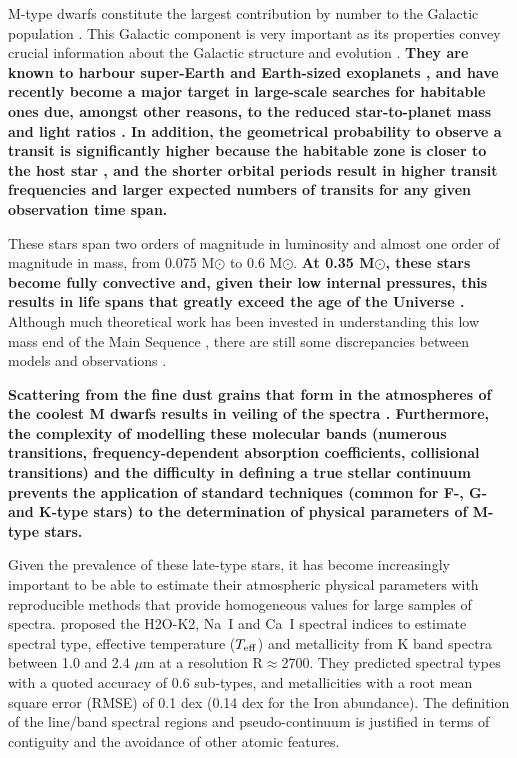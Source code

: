
M-type dwarfs constitute the largest contribution by number to the
Galactic population \citep{2010AJ....139.2679B}. This Galactic
component is very important as its properties convey crucial
information about the Galactic structure and
evolution \citep{2013A&A...556A.110B}. {\bf They are known to harbour
super-Earth \citep{2013A&A...556A.110B} and Earth-sized
exoplanets \citep{2015ApJ...807...45D}, and have recently become a
major target in large-scale searches for habitable ones due, amongst
other reasons, to the reduced star-to-planet mass and light
ratios \citep{2015A&A...577A.128A}. In addition, the geometrical
probability to observe a transit is significantly higher because the
habitable zone is closer to the host star \citep{Shields20161}, and
the shorter orbital periods result in higher transit frequencies and
larger expected numbers of transits for any given observation time
span.}

These stars span two orders of magnitude in luminosity and almost one
order of magnitude in mass, from 0.075 M$\odot$ to 0.6 M$\odot$. {\bf
At 0.35 M$\odot$, these stars become fully convective and, given their
low internal pressures, this results in life spans that greatly exceed
the age of the Universe \citep{2005AN....326..913A}.} Although much
theoretical work has been invested in understanding this low mass end
of the Main Sequence \citep{2008ApJ...676.1262B}, there are still some
discrepancies between models and observations \citep[see e.g.][for an
account of the observed inflated radii and cooler temperatures with
respect to model predictions]{2013AN....334....4T}.

{\bf Scattering from the fine dust grains that form in the atmospheres
of the coolest M dwarfs results in veiling of the
spectra \citep{2012EAS....57....3A}. Furthermore, the complexity of
modelling these molecular bands (numerous transitions,
frequency-dependent absorption coefficients, collisional transitions)
and the difficulty in defining a true stellar continuum prevents the
application of standard techniques (common for F-, G- and K-type
stars) to the determination of physical parameters of M-type stars.}

Given the prevalence of these late-type stars, it has become
increasingly important to be able to estimate their atmospheric
physical parameters with reproducible methods that provide homogeneous
values for large samples of spectra. \cite{2012ApJ...748...93R}
proposed the H2O-K2, Na~{\sc I} and Ca~{\sc I} spectral indices to
estimate spectral type, effective temperature ($T_{\rm eff}$) and
metallicity from K band spectra between 1.0 and 2.4 $\mu$m at a
resolution R$\approx$2700. They predicted spectral types with a quoted
accuracy of 0.6 sub-types, and metallicities with a root mean square
error (RMSE) of 0.1 dex (0.14 dex for the Iron abundance). The
definition of the line/band spectral regions and pseudo-continuum is
justified in terms of contiguity and the avoidance of other atomic
features. 

